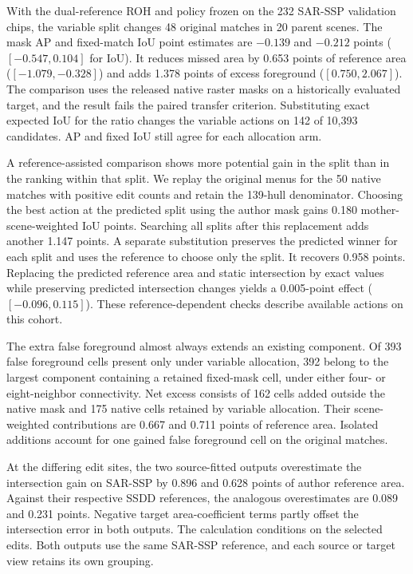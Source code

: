 \documentclass[journal]{IEEEtran}
\begin{document}
With the dual-reference ROH and policy frozen on the 232 SAR-SSP validation chips, the variable split changes 48 original matches in 20 parent scenes. The mask AP and fixed-match IoU point estimates are \(-0.139\) and \(-0.212\) points (\([-0.547,0.104]\) for IoU). It reduces missed area by 0.653 points of reference area (\([-1.079,-0.328]\)) and adds 1.378 points of excess foreground (\([0.750,2.067]\)). The comparison uses the released native raster masks on a historically evaluated target, and the result fails the paired transfer criterion. Substituting exact expected IoU for the ratio changes the variable actions on 142 of 10,393 candidates. AP and fixed IoU still agree for each allocation arm.

A reference-assisted comparison shows more potential gain in the split than in the ranking within that split. We replay the original menus for the 50 native matches with positive edit counts and retain the 139-hull denominator. Choosing the best action at the predicted split using the author mask gains 0.180 mother-scene-weighted IoU points. Searching all splits after this replacement adds another 1.147 points. A separate substitution preserves the predicted winner for each split and uses the reference to choose only the split. It recovers 0.958 points. Replacing the predicted reference area and static intersection by exact values while preserving predicted intersection changes yields a 0.005-point effect (\([-0.096,0.115]\)). These reference-dependent checks describe available actions on this cohort.

The extra false foreground almost always extends an existing component. Of 393 false foreground cells present only under variable allocation, 392 belong to the largest component containing a retained fixed-mask cell, under either four- or eight-neighbor connectivity. Net excess consists of 162 cells added outside the native mask and 175 native cells retained by variable allocation. Their scene-weighted contributions are 0.667 and 0.711 points of reference area. Isolated additions account for one gained false foreground cell on the original matches.

At the differing edit sites, the two source-fitted outputs overestimate the intersection gain on SAR-SSP by 0.896 and 0.628 points of author reference area. Against their respective SSDD references, the analogous overestimates are 0.089 and 0.231 points. Negative target area-coefficient terms partly offset the intersection error in both outputs. The calculation conditions on the selected edits. Both outputs use the same SAR-SSP reference, and each source or target view retains its own grouping.
\end{document}
